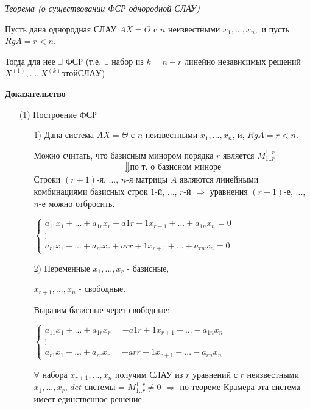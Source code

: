 \textit{Теорема (о существовании ФСР однородной СЛАУ)}

\vspace*{15pt}

Пусть дана однородная СЛАУ $AX = \Theta$ c $n$ неизвестными $x_1, ..., x_n,$ и пусть $RgA = r < n$.

Тогда для нее $\exists$ ФСР (т.е. $\exists$ набор из $k = n - r$ линейно независимых решений $X^{(1)}, ..., X^{(k)} этой СЛАУ$)

\vspace*{15pt}

{\bf{Доказательство}}

\begin{enumerate}
    \item[(1)] Построение ФСР
    \begin{enumerate}
        \item[1)] Дана система $AX = \Theta$ с $n$ неизвестными $x_1, ..., x_n$, и, $RgA = r < n$.

        Можно считать, что базисным минором порядка $r$ является $M^{1..r}_{1..r}$
        $$\Downarrow\text{по т. о базисном миноре}$$
        Строки $(r + 1)$-я, ..., $n$-я матрицы $A$ являются линейными комбинациями базисных строк $1$-й, ..., $r$-й $\Rightarrow$ уравнения $(r + 1)$-е, ..., $n$-е можно отбросить.

        $\begin{cases} a_{11}x_1 + ... + a_{1r}x_r + a{1 r+1}x_{r+1} + ... + a_{1n}x_n = 0\\\vdots\\a_{r1}x_1 + ... + a_{rr}x_r + a{r r+1}x_{r+1} + ... + a_{rn}x_n = 0\end{cases}$

        \item[2)] Переменные $x_1, ..., x_r$ - базисные,

        $x_{r+1}, ..., x_n$ - свободные.

        Выразим базисные через свободные:

        $\begin{cases} a_{11}x_1 + ... + a_{1r}x_r = - a{1 r+1}x_{r+1} - ... - a_{1n}x_n\\\vdots\\a_{r1}x_1 + ... + a_{rr}x_r = - a{r r+1}x_{r+1} - ... - a_{rn}x_n\end{cases}$

        $\forall$ набора $x_{r+1}, ..., x_n$ получим СЛАУ из $r$ уравнений с $r$ неизвестными $x_1, ..., x_r$, $det$ системы = $M^{1..r}_{1..r} \ne 0$ $\Rightarrow$ по теореме Крамера эта система имеет единственное решение.


\end{enumerate}
\end{enumerate}
